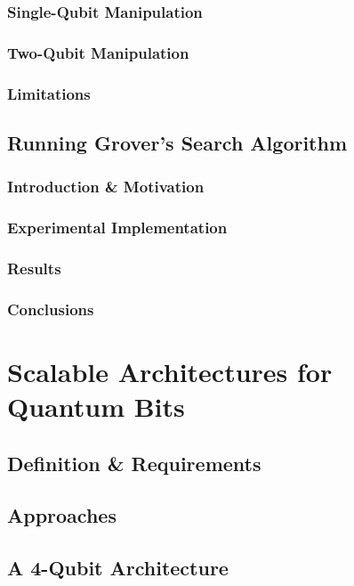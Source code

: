 \documentclass{scrbook}
\begin{document}
\subsection{Single-Qubit Manipulation}

\subsection{Two-Qubit Manipulation}

\subsection{Limitations}

\section{Running Grover's Search Algorithm}

\subsection{Introduction \& Motivation}

\subsection{Experimental Implementation}

\subsection{Results}

\subsection{Conclusions}

\chapter{Scalable Architectures for Quantum Bits}

\section{Definition \& Requirements}

\section{Approaches}

\section{A 4-Qubit Architecture}
\end{document}
